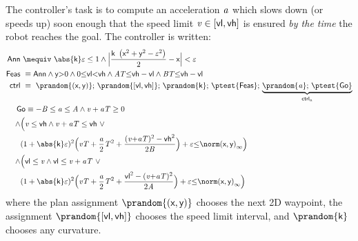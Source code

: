 \documentclass[12pt]{cmuthesis}
\theoremstyle{definition}
\theoremstyle{remark}
\begin{document}
The controller's task is to compute an acceleration ${\it a}$ which slows down (or speeds up) soon enough that the speed limit ${\it v} \in [\textsf{vl},\textsf{vh}]$ is ensured \emph{by the time} the robot reaches the goal.
The controller is written:
\newcommand{\admiss}{\textsf{Go}} %
\newcommand{\planreq}{\textsf{Feas}} %
\newcommand{\veps}{\varepsilon}
\newcommand{\annul}{\textsf{Ann}\xspace}
\newcommand{\adjustSpeedDist}{\delta_\mathsf{Lim}\xspace}
\newcommand{\controllableGoalDist}{\mathsf{Lim}}
{\small\begin{align*}
\annul &~\mequiv~\abs{\kvar}\veps \leq 1 \land \Big|\frac{ \kvar~\left(\xgvar^2 +\ygvar^2 - \veps^2 \right)}{2} - \xgvar\Big| < \veps\\
\label{eq:planReq} \planreq &~\equiv \annul \land \ygvar{>}0 \land 0{\leq}\vlvar{<}\vhvar \land \Avar\Tvar{\leq}\vhvar-\vlvar \land \Bvar\Tvar{\leq}\vhvar-\vlvar\\
\ctrl &~\equiv~ \prandom{(\xgvar,\ygvar)};\,\prandom{[\vlvar,\vhvar]};\,\prandom{\kvar};\,\ptest{\planreq};\,\underbrace{\prandom{\avar};\,\ptest{\admiss}}_{\ctrlliv}\\
      ~&\hspace*{-5pt}\admiss \equiv-\Bvar\leq \avar \leq\Avar \land \vvar + \avar\Tvar \geq 0 \\
\land & \Bigl(\vvar \leq \vhvar \land \vvar+\avar\Tvar\leq \vhvar ~\lor \\
      & (1+\abs{\kvar}\veps)^2 \Bigl(\vvar\Tvar+\frac{\avar}{2}\Tvar^2 + \frac{(\vvar{+}\avar\Tvar)^2-\vhvar^2}{2\Bvar}\Bigr) + \veps{\leq}\lnorm{(\xgvar,\ygvar)} \Bigr)\\
\land & \Bigl(\vlvar \leq \vvar \land \vlvar \leq \vvar+\avar\Tvar ~\lor\\
      & (1+\abs{\kvar}\veps)^2 \Bigl(\vvar\Tvar+\frac{\avar}{2}\Tvar^2 + \frac{\vlvar^2 - (\vvar{+}\avar\Tvar)^2}{2\Avar}\Bigr) + \veps{\leq}\lnorm{(\xgvar,\ygvar)}\Bigr)\end{align*}}
\noindent where the plan assignment $\prandom{(\xgvar,\ygvar)}$ chooses the next 2D waypoint, the assignment $\prandom{[\vlvar,\vhvar]}$ chooses the speed limit interval, and $\prandom{\kvar}$ chooses any curvature.
\end{document}
